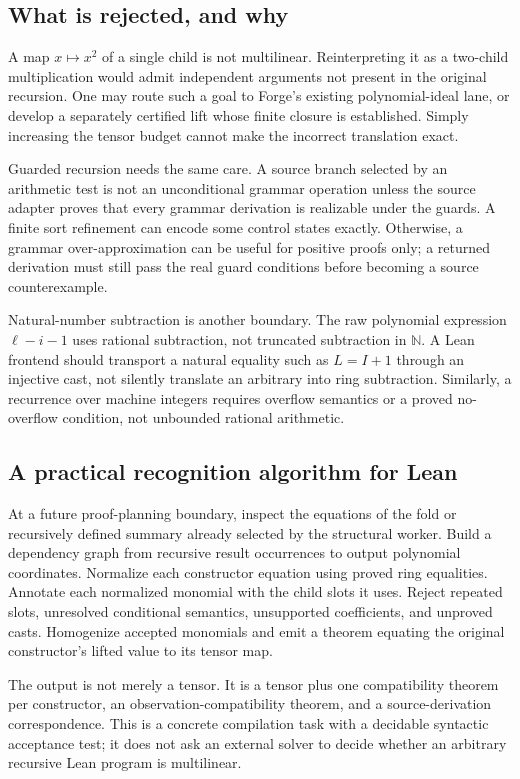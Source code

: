 \documentclass[11pt,letterpaper]{article}
\theoremstyle{definition}\newtheorem{definition}[theorem]{Definition}
\theoremstyle{remark}\newtheorem{remark}[theorem]{Remark}
\newcommand{\N}{\mathbb N}
\newcommand{\code}[1]{\texttt{\detokenize{#1}}}
\begin{document}
\subsection{What is rejected, and why}
A map $x\mapsto x^2$ of a single child is not multilinear. Reinterpreting it as a two-child multiplication would admit independent arguments not present in the original recursion. One may route such a goal to Forge's existing polynomial-ideal lane, or develop a separately certified lift whose finite closure is established. Simply increasing the tensor budget cannot make the incorrect translation exact.

Guarded recursion needs the same care. A source branch selected by an arithmetic test is not an unconditional grammar operation unless the source adapter proves that every grammar derivation is realizable under the guards. A finite sort refinement can encode some control states exactly. Otherwise, a grammar over-approximation can be useful for positive proofs only; a returned derivation must still pass the real guard conditions before becoming a source counterexample.

Natural-number subtraction is another boundary. The raw polynomial expression $\ell-i-1$ uses rational subtraction, not truncated subtraction in $\N$. A Lean frontend should transport a natural equality such as $L=I+1$ through an injective cast, not silently translate an arbitrary \code{Nat.sub} into ring subtraction. Similarly, a recurrence over machine integers requires overflow semantics or a proved no-overflow condition, not unbounded rational arithmetic.

\subsection{A practical recognition algorithm for Lean}
At a future proof-planning boundary, inspect the equations of the fold or recursively defined summary already selected by the structural worker. Build a dependency graph from recursive result occurrences to output polynomial coordinates. Normalize each constructor equation using proved ring equalities. Annotate each normalized monomial with the child slots it uses. Reject repeated slots, unresolved conditional semantics, unsupported coefficients, and unproved casts. Homogenize accepted monomials and emit a theorem equating the original constructor's lifted value to its tensor map.

The output is not merely a tensor. It is a tensor plus one compatibility theorem per constructor, an observation-compatibility theorem, and a source-derivation correspondence. This is a concrete compilation task with a decidable syntactic acceptance test; it does not ask an external solver to decide whether an arbitrary recursive Lean program is multilinear.
\end{document}
